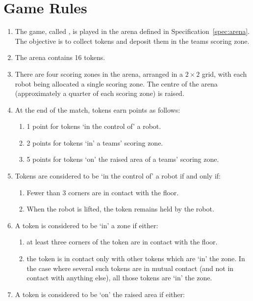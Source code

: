 \section{Game Rules}
\label{sec:rules}

\begin{enumerate}
  \item The game, called \emph{\gamename}, is played in the arena defined in
        Specification~\ref{spec:arena}. The objective is to collect tokens and
        deposit them in the teams scoring zone.
  \item The arena contains 16 tokens.
  \item There are four scoring zones in the arena, arranged in a $2\times2$
        grid, with each robot being allocated a single scoring zone. The centre
        of the arena (approximately a quarter of each scoring zone) is raised.
  \item At the end of the match, tokens earn points as follows:
    \begin{enumerate}
      \item 1 point for tokens `in the control of' a robot.
      \item 2 points for tokens `in' a teams' scoring zone.
      \item 5 points for tokens `on' the raised area of a teams' scoring zone.
    \end{enumerate}
  \item Tokens are considered to be `in the control of' a robot if and only if:
    \begin{enumerate}
      \item Fewer than 3 corners are in contact with the floor.
      \item When the robot is lifted, the token remains held by the robot.
    \end{enumerate}
  \item A token is considered to be `in' a zone if either:
    \begin{enumerate}
      \item at least three corners of the token are in contact with the floor.
      \item the token is in contact only with other tokens which are `in' the zone.
            In the case where several such tokens are in mutual contact (and not in
            contact with anything else), all those tokens are `in' the zone.
    \end{enumerate}
  \item A token is considered to be `on' the raised area if either:

\end{enumerate}
